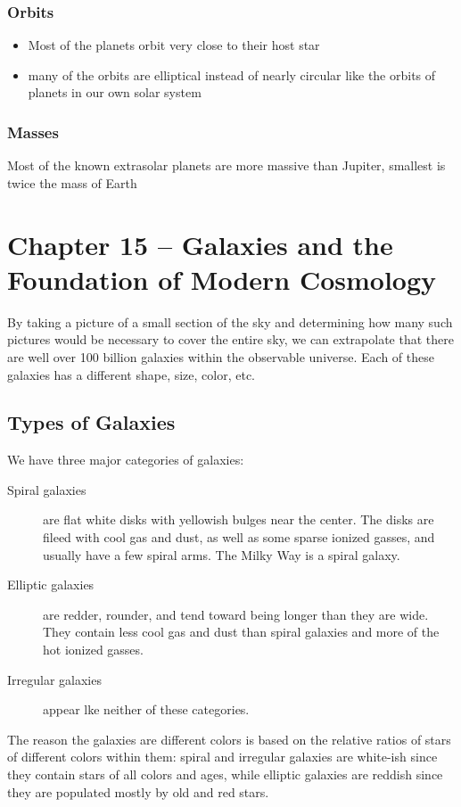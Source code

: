 \documentclass[12pt]{article}
\begin{document}
\subsubsection*{Orbits}
\begin{itemize}
\item Most of the planets orbit very close to their host star
\item many of the orbits are elliptical instead of nearly circular like the orbits of planets in our own solar system
\end{itemize}

\subsubsection*{Masses}
Most of the known extrasolar planets are more massive than Jupiter, smallest is twice the mass of Earth

\section{Chapter 15 -- Galaxies and the Foundation of Modern Cosmology}
By taking a picture of a small section of the sky and determining how many such pictures would be necessary to cover the entire sky, we can extrapolate that there are well over 100 billion galaxies within the observable universe. Each of these galaxies has a different shape, size, color, etc.

\subsection{Types of Galaxies}
We have three major categories of galaxies:
\begin{description}
\item[Spiral galaxies] are flat white disks with yellowish bulges near the center. The disks are fileed with cool gas and dust, as well as some sparse ionized gasses, and usually have a few spiral arms. The Milky Way is a spiral galaxy.
\item[Elliptic galaxies] are redder, rounder, and tend toward being longer than they are wide. They contain less cool gas and dust than spiral galaxies and more of the hot ionized gasses.
\item[Irregular galaxies] appear lke neither of these categories.
\end{description}

The reason the galaxies are different colors is based on the relative ratios of stars of different colors within them: spiral and irregular galaxies are white-ish since they contain stars of all colors and ages, while elliptic galaxies are reddish since they are populated mostly by old and red stars.
\end{document}
